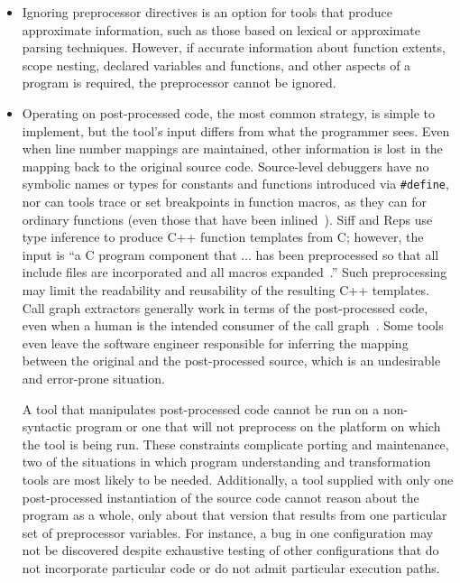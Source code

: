 \documentclass[10pt]{article}
\begin{document}
\begin{itemize}

\item Ignoring preprocessor directives is an option for tools that produce
  approximate information, such as those based on lexical or approximate
  parsing techniques.  However, if accurate information about function
  extents, scope nesting, declared variables and functions, and other
  aspects of a program is required, the preprocessor cannot be ignored.

\item Operating on post-processed code, the most common strategy, is
  simple to implement, but the tool's input differs from what the
  programmer sees.  Even when line number mappings are maintained, other
  information is lost in the mapping back to the original source code.
  Source-level debuggers have no symbolic names or types for constants and
  functions introduced via {\tt \#define}, nor can tools trace or set
  breakpoints in function macros, as they can for ordinary functions (even
  those that have been inlined~\cite{Zellweger83:TR}).  Siff and Reps use
  type inference to produce C++ function templates from C; however, the
  input is ``a C program component that $\ldots$ has been preprocessed so
  that all include files are incorporated and all macros
  expanded~\cite[p.~145]{Siff-fse96}.''  Such preprocessing may limit the
  readability and reusability of the resulting C++ templates.  Call graph
  extractors generally work in terms of the post-processed code, even when
  a human is the intended consumer of the call graph~\cite{Murphy-icse18}.
  Some tools even leave the software engineer responsible for inferring the
  mapping between the original and the post-processed source, which is an
  undesirable and error-prone situation.
  
  A tool that manipulates post-processed code cannot be run on a
  non-syntactic program or one that will not preprocess on the platform on
  which the tool is being run.  These constraints complicate porting and
  maintenance, two of the situations in which program understanding and
  transformation tools are most likely to be needed.  Additionally, a tool
  supplied with only one post-processed instantiation of the source code
  cannot reason about the program as a whole, only about that version that
  results from one particular set of preprocessor variables.  For instance,
  a bug in one configuration may not be discovered despite exhaustive
  testing of other configurations that do not incorporate particular code
  or do not admit particular execution paths.


\end{itemize}
\end{document}
